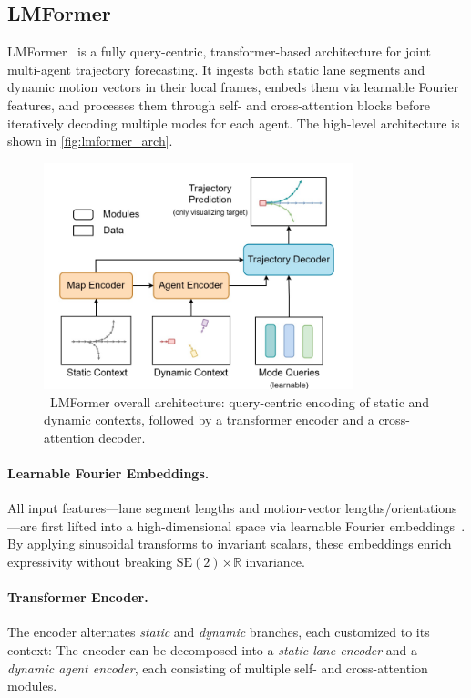 \subsection{LMFormer}
\label{ssec:lmformer}

LMFormer~\cite{lmformerYadav2025} is a fully query-centric, transformer-based architecture for joint multi-agent trajectory forecasting. It ingests both static lane segments and dynamic motion vectors in their local frames, embeds them via learnable Fourier features, and processes them through self- and cross-attention blocks before iteratively decoding multiple modes for each agent. The high-level architecture is shown in \autoref{fig:lmformer_arch}.

\begin{figure}[ht]
  \centering
  \includegraphics[width=0.8\textwidth]{figures/lmformer_arch.png}
  \caption{\cite{lmformerYadav2025}~LMFormer overall architecture: query-centric encoding of static and dynamic contexts, followed by a transformer encoder and a cross-attention decoder.}
  \label{fig:lmformer_arch}
\end{figure}


\paragraph{Learnable Fourier Embeddings.}
All input features—lane segment lengths and motion-vector lengths/orientations—are first lifted into a high-dimensional space via learnable Fourier embeddings~\cite{li2021llearnableFourier}. By applying sinusoidal transforms to invariant scalars, these embeddings enrich expressivity without breaking \(\mathrm{SE}(2)\!\rtimes\!\mathbb{R}\) invariance.

\paragraph{Transformer Encoder.}
The encoder alternates \emph{static} and \emph{dynamic} branches, each customized to its context:
The encoder can be decomposed into a \emph{static lane encoder} and a \emph{dynamic agent encoder}, each consisting of multiple self- and cross-attention modules.

